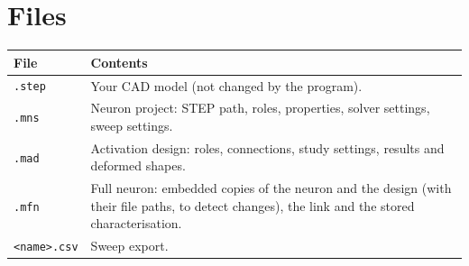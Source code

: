 \documentclass[11pt,a4paper]{article}
\newcommand{\code}[1]{\texttt{#1}}
\begin{document}
\section{Files}

\begin{center}
\begin{tabularx}{\textwidth}{@{}l X@{}}
\toprule
File & Contents \\
\midrule
\code{.step} & Your CAD model (not changed by the program). \\
\code{.mns} & Neuron project: STEP path, roles, properties, solver settings, sweep settings. \\
\code{.mad} & Activation design: roles, connections, study settings, results and deformed shapes. \\
\code{.mfn} & Full neuron: embedded copies of the neuron and the design (with their file paths, to detect
  changes), the link and the stored characterisation. \\
\code{<name>.csv} & Sweep export. \\
\bottomrule
\end{tabularx}
\end{center}
\end{document}
